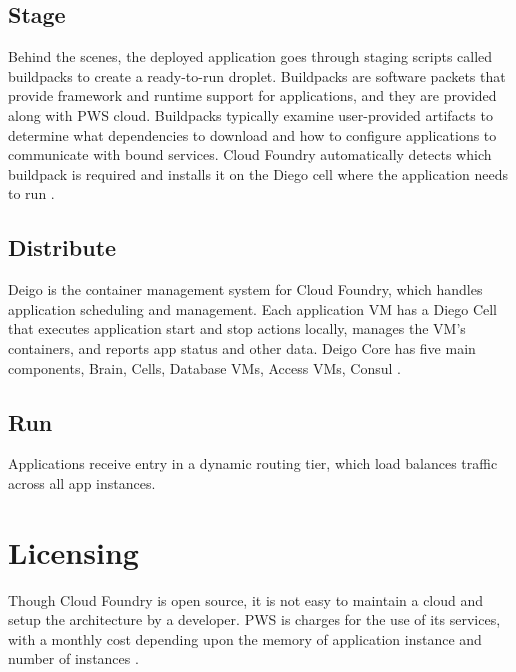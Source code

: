 \documentclass[9pt,twocolumn,twoside]{../../styles/osajnl}
\begin{document}
\subsection{Stage}
Behind the scenes, the deployed application goes through staging scripts called buildpacks to create a ready-to-run droplet.  Buildpacks are software packets that provide framework and runtime support for applications, and they are provided along with PWS cloud. Buildpacks typically examine user-provided artifacts to determine what dependencies to download and how to configure applications to communicate with bound services. Cloud Foundry automatically detects which buildpack is required and installs it on the Diego cell where the application needs to run \cite{www-pws-buildpacks}. 

\subsection{Distribute}
Deigo is the container management system for Cloud Foundry, which handles application scheduling and management. Each application VM has a Diego Cell that executes application start and stop actions locally, manages the VM’s containers, and reports app status and other data. Deigo Core has five main components, Brain, Cells, Database VMs, Access VMs, Consul \cite{www-pws-diego}.


\subsection{Run}
Applications receive entry in a dynamic routing tier, which load balances traffic across all app instances. 

\section{Licensing}
Though Cloud Foundry is open source, it is not easy to maintain a cloud and setup the architecture by a developer. PWS is charges for the use of its services, with a monthly cost depending upon the memory of application instance and number of instances \cite{www-pws-pricing}. 
\end{document}
